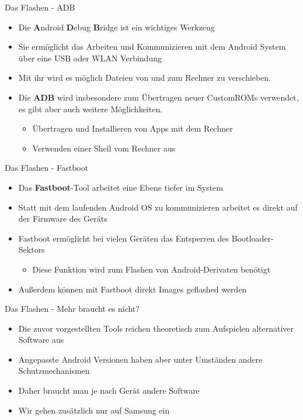 \begin{frame}{Das Flashen - ADB}
	\begin{itemize}[<+->]
		\item Die \textbf{A}ndroid \textbf{D}ebug \textbf{B}ridge ist ein wichtiges Werkzeug
		\item Sie ermöglicht das Arbeiten und Kommunizieren mit dem Android System über eine USB oder WLAN Verbindung
		\item Mit ihr wird es möglich Dateien von und zum Rechner zu verschieben.
		\item Die \textbf{ADB} wird insbesondere zum Übertragen neuer CustomROMs verwendet, es gibt aber auch weitere Möglichkeiten.
		\begin{itemize}[<+->]
			\item Übertragen und Installieren von Apps mit dem Rechner
			\item Verwenden einer Shell vom Rechner aus
		\end{itemize}
	\end{itemize}
\end{frame}

\begin{frame}{Das Flashen - Fastboot}
	\begin{itemize}[<+->]
		\item Das \textbf{Fastboot}-Tool arbeitet eine Ebene tiefer im System
		\item Statt mit dem laufenden Android OS zu kommunizieren arbeitet es direkt auf der Firmware des Geräts
		\item Fastboot ermöglicht bei vielen Geräten das Entsperren des Bootloader-Sektors
		\begin{itemize}[<+->]
			\item Diese Funktion wird zum Flashen von Android-Derivaten benötigt
		\end{itemize}
		\item Außerdem können mit Fastboot direkt Images geflashed werden
	\end{itemize}
\end{frame}

\begin{frame}{Das Flashen - Mehr braucht es nicht?}
	\begin{itemize}[<+->]
		\item Die zuvor vorgestellten Tools reichen theoretisch zum Aufspielen alternativer Software aus
		\item Angepasste Android Versionen haben aber unter Umständen andere Schutzmechanismen
		\item Daher braucht man je nach Gerät andere Software
		\item Wir gehen zusätzlich nur auf Samsung ein
	\end{itemize}
\end{frame}

